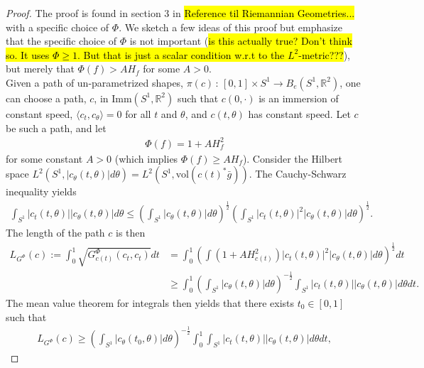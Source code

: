 \documentclass[a4,danish]{article}
\theoremstyle{break}
\theoremstyle{definition}
\theoremstyle{Break}
\newcommand{\R}{\mathbb{R}}
\begin{document}
\begin{proof}
The proof is found in section 3 in \hl{Reference til  Riemannian Geometries...} with a specific choice of $\Phi$. We sketch a few ideas of this proof but emphasize that the specific choice of $\Phi$ is not important (\hl{is this actually true? Don't think so. It uses $\Phi \geq 1$. But that is just a scalar condition w.r.t to the $L^2$-metric???}), but merely that $\Phi(f) > AH_f$ for some $A > 0$. \\[0.2 cm]
Given a path of un-parametrized shapes, $\pi(c) \, : \, [0,1] \times S^1 \rightarrow B_e(S^1, \R^2)$, one can choose a path, $c$, in Imm$(S^1, \R^2)$ such that $c(0, \cdot)$ is an immersion of constant speed, $\langle c_t, c_\theta \rangle = 0$ for all $t$ and $\theta$, and $c(t , \theta)$ has constant speed. Let $c$ be such a path, and let
\begin{align*}
\Phi(f) = 1 + A H_f ^2
\end{align*}  
for some constant $A > 0$ (which implies $\Phi(f) \geq AH_f$). Consider the Hilbert space $L^2(S^1, \left| c_\theta(t, \theta) \right| d\theta) = L^2(S^1, \text{vol} (c(t)^* \bar{g}))$. The Cauchy-Schwarz inequality yields
\begin{align*}
\int_{S^1} \left| c_t(t, \theta) \right| \left| c_\theta(t, \theta) \right| d \theta \leq \left(\int_{S^1} \left| c_\theta(t, \theta) \right| d \theta \right) ^{\frac{1}{2}} \left( \int_{S^1} \left| c_t(t, \theta) \right|^2 \left| c_\theta(t, \theta) \right| d \theta   \right) ^{\frac{1}{2}}.
\end{align*} 
The length of the path $c$ is then
\begin{align*}
L_{G^{\Phi}}(c) := \int_0^1  \sqrt{G^{\Phi}_{c(t)}(c_t, c_t)} dt &= \int_0^1 \left( \int (1 + AH_{c(t)}^2 ) \left| c_t(t, \theta) \right|^2 \left| c_\theta(t, \theta) \right| d\theta     \right) ^{\frac{1}{2}} dt \\
& \geq \int_0^1 \left(\int_{S^1} \left| c_\theta(t, \theta) \right| d \theta \right) ^{-\frac{1}{2}} \int_{S^1} \left| c_t(t, \theta) \right| \left| c_\theta(t, \theta) \right| d \theta dt.
\end{align*}
The mean value theorem for integrals then yields that there exists $t_0 \in [0, 1]$ such that
\begin{align*}
L_{G^{\Phi}}(c)\geq  \left(\int_{S^1} \left| c_\theta(t_0, \theta) \right| d \theta \right) ^{-\frac{1}{2}} \int_0^1 \int_{S^1} \left| c_t(t, \theta) \right| \left| c_\theta(t, \theta) \right| d \theta dt,
\end{align*}

\end{proof}
\end{document}
